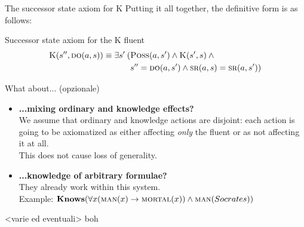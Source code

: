 \begin{frame}{The successor state axiom for K}
    Putting it all together, the definitive form is as follows:

    \begin{block}{Successor state axiom for the K fluent}
        \vspace{-0.5cm}
        \begin{align*}
            \textsc{K}(s'', \textsc{do}(a, s)) \equiv \exists s' \: (&\textsc{Poss}(a, s') \land \textsc{K}(s',s) \: \land \\
            & s'' = \textsc{do}(a, s') \land \textsc{sr}(a, s) = \textsc{sr}(a, s'))
        \end{align*}
    \end{block}
\end{frame}

\begin{frame}{What about... (opzionale)}
    \begin{itemize}
        \item \textbf{...mixing ordinary and knowledge effects?} \\
            We assume that ordinary and knowledge actions are disjoint:
            each action is going to be axiomatized
            as either affecting \emph{only} the \sck{} fluent
            or as not affecting it at all. \\
            This does not cause loss of generality.
        \item \textbf{...knowledge of arbitrary formulae?} \\
            They already work within this system. \\
            Example: \( \textbf{Knows}(\forall x (\textsc{man}(x) \rightarrow \textsc{mortal}(x)) \land \textsc{man}(Socrates)) \)
    \end{itemize}
\end{frame}

\begin{frame}{<varie ed eventuali>}
    boh
\end{frame}
